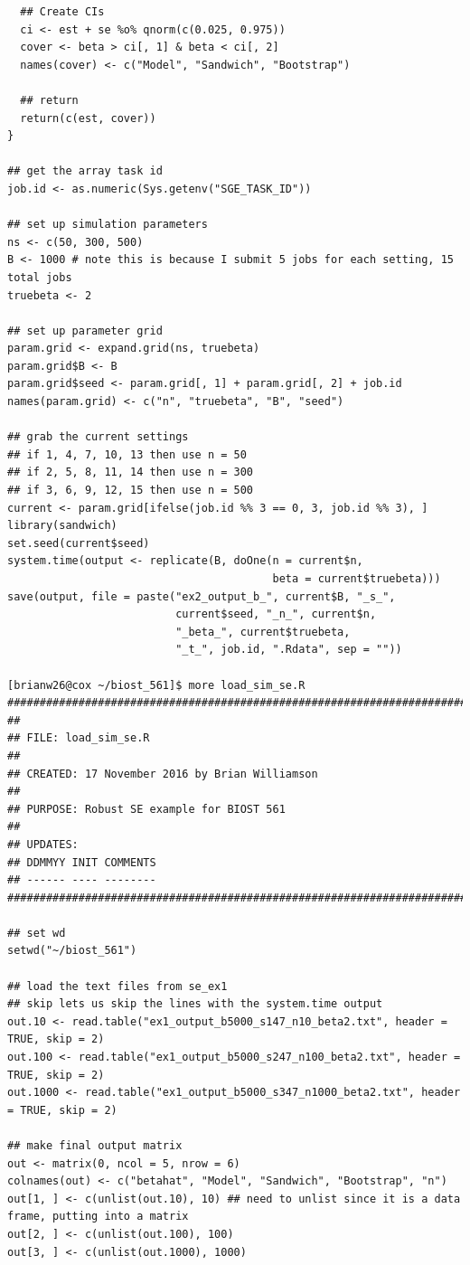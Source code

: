 \documentclass{article}
\begin{document}
\begin{enumerate}
{\begin{verbatim}
  ## Create CIs
  ci <- est + se %o% qnorm(c(0.025, 0.975))
  cover <- beta > ci[, 1] & beta < ci[, 2]
  names(cover) <- c("Model", "Sandwich", "Bootstrap")
  
  ## return
  return(c(est, cover))
}

## get the array task id
job.id <- as.numeric(Sys.getenv("SGE_TASK_ID"))

## set up simulation parameters
ns <- c(50, 300, 500)
B <- 1000 # note this is because I submit 5 jobs for each setting, 15 total jobs
truebeta <- 2

## set up parameter grid
param.grid <- expand.grid(ns, truebeta)
param.grid$B <- B
param.grid$seed <- param.grid[, 1] + param.grid[, 2] + job.id
names(param.grid) <- c("n", "truebeta", "B", "seed")

## grab the current settings
## if 1, 4, 7, 10, 13 then use n = 50
## if 2, 5, 8, 11, 14 then use n = 300
## if 3, 6, 9, 12, 15 then use n = 500
current <- param.grid[ifelse(job.id %% 3 == 0, 3, job.id %% 3), ]
library(sandwich)
set.seed(current$seed)
system.time(output <- replicate(B, doOne(n = current$n, 
                                         beta = current$truebeta)))
save(output, file = paste("ex2_output_b_", current$B, "_s_", 
                          current$seed, "_n_", current$n, 
                          "_beta_", current$truebeta, 
                          "_t_", job.id, ".Rdata", sep = ""))
                          
[brianw26@cox ~/biost_561]$ more load_sim_se.R
#########################################################################
##
## FILE: load_sim_se.R
##
## CREATED: 17 November 2016 by Brian Williamson
##
## PURPOSE: Robust SE example for BIOST 561
##
## UPDATES:
## DDMMYY INIT COMMENTS
## ------ ---- --------
#########################################################################

## set wd
setwd("~/biost_561")

## load the text files from se_ex1
## skip lets us skip the lines with the system.time output
out.10 <- read.table("ex1_output_b5000_s147_n10_beta2.txt", header = TRUE, skip = 2)
out.100 <- read.table("ex1_output_b5000_s247_n100_beta2.txt", header = TRUE, skip = 2)
out.1000 <- read.table("ex1_output_b5000_s347_n1000_beta2.txt", header = TRUE, skip = 2)

## make final output matrix
out <- matrix(0, ncol = 5, nrow = 6)
colnames(out) <- c("betahat", "Model", "Sandwich", "Bootstrap", "n")
out[1, ] <- c(unlist(out.10), 10) ## need to unlist since it is a data frame, putting into a matrix
out[2, ] <- c(unlist(out.100), 100)
out[3, ] <- c(unlist(out.1000), 1000)


\end{verbatim}}
\end{enumerate}
\end{document}
